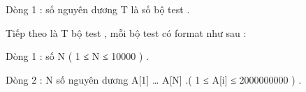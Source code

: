 Dòng 1 : số nguyên dương T là số bộ test .   


   Tiếp theo là T bộ test , mỗi bộ test có format như sau :   


   Dòng 1 : số N ( 1 ≤ N ≤ 10000 ) .   


   Dòng 2 : N số nguyên dương A[1] … A[N] .( 1 ≤ A[i] ≤ 2000000000 ) .